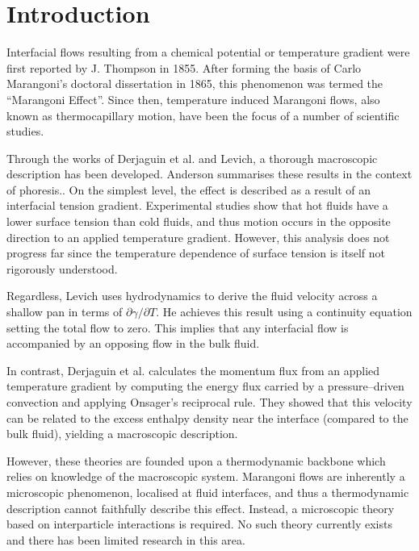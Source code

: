 \section{Introduction}
Interfacial flows resulting from a chemical potential or temperature gradient were first reported by J. Thompson in 1855.\cite{JThompson}
After forming the basis of Carlo Marangoni's doctoral dissertation in 1865, this phenomenon was termed the ``Marangoni Effect''.\cite{Marangoni}
Since then, temperature induced Marangoni flows, also known as thermocapillary motion, have been the focus of a number of scientific studies.

Through the works of Derjaguin et al.\cite{SurfaceForces} and Levich\cite{Levich}, a thorough macroscopic description has been developed.
Anderson summarises these results in the context of phoresis.\cite{Anderson}.
On the simplest level, the effect is described as a result of an interfacial tension gradient.
Experimental studies show that hot fluids have a lower surface tension than cold fluids,\cite{Ficalbi1972,Kayser1975} and thus motion occurs in the opposite direction to an applied temperature gradient.
However, this analysis does not progress far since the temperature dependence of surface tension is itself not rigorously understood.

Regardless, Levich uses hydrodynamics to derive the fluid velocity across a shallow pan in terms of $\partial \gamma / \partial T$.
He achieves this result using a continuity equation setting the total flow to zero.
This implies that any interfacial flow is accompanied by an opposing flow in the bulk fluid.

In contrast, Derjaguin et al. calculates the momentum flux from an applied temperature gradient by computing the energy flux carried by a pressure--driven convection and applying Onsager's reciprocal rule.\cite{SurfaceForces}
They showed that this velocity can be related to the excess enthalpy density near the interface (compared to the bulk fluid), yielding a macroscopic description.

However, these theories are founded upon a thermodynamic backbone which relies on knowledge of the macroscopic system.
Marangoni flows are inherently a microscopic phenomenon, localised at fluid interfaces, and thus a thermodynamic description cannot faithfully describe this effect.
Instead, a microscopic theory based on interparticle interactions is required.
No such theory currently exists and there has been limited research in this area.\cite{HolgerBoppHampe}

